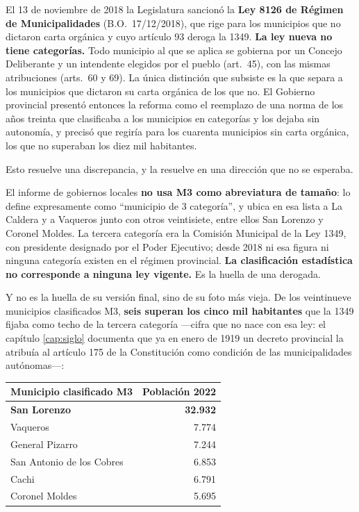 El 13 de noviembre de 2018 la Legislatura sancionó la \textbf{Ley 8126 de Régimen de Municipalidades} (B.O.\ 17/12/2018), que rige para los municipios que no dictaron carta orgánica y cuyo artículo 93 deroga la 1349. \textbf{La ley nueva no tiene categorías.} Todo municipio al que se aplica se gobierna por un Concejo Deliberante y un intendente elegidos por el pueblo (art.\ 45), con las mismas atribuciones (arts.\ 60 y 69). La única distinción que subsiste es la que separa a los municipios que dictaron su carta orgánica de los que no. El Gobierno provincial presentó entonces la reforma como el reemplazo de una norma de los años treinta que clasificaba a los municipios en categorías y los dejaba sin autonomía, y precisó que regiría para los cuarenta municipios sin carta orgánica, los que no superaban los diez mil habitantes.

\begin{cautela}
Esto resuelve una discrepancia, y la resuelve en una dirección que no se esperaba.

El informe de gobiernos locales \textbf{no usa M3 como abreviatura de tamaño}: lo define expresamente como ``municipio de 3\textordmasculine{} categoría'', y ubica en esa lista a La Caldera y a Vaqueros junto con otros veintisiete, entre ellos San Lorenzo y Coronel Moldes. La tercera categoría era la Comisión Municipal de la Ley 1349, con presidente designado por el Poder Ejecutivo; desde 2018 ni esa figura ni ninguna categoría existen en el régimen provincial. \textbf{La clasificación estadística no corresponde a ninguna ley vigente.} Es la huella de una derogada.

Y no es la huella de su versión final, sino de su foto más vieja. De los veintinueve municipios clasificados M3, \textbf{seis superan los cinco mil habitantes} que la 1349 fijaba como techo de la tercera categoría ---cifra que no nace con esa ley: el capítulo \ref{cap:siglo} documenta que ya en enero de 1919 un decreto provincial la atribuía al artículo 175 de la Constitución como condición de las municipalidades autónomas---:
\end{cautela}

{\small
\begin{longtable}{@{}lr@{}}
\toprule
\textbf{Municipio clasificado M3} & \textbf{Población 2022} \\
\midrule
\endhead
\textbf{San Lorenzo} & \textbf{32.932} \\
Vaqueros & 7.774 \\
General Pizarro & 7.244 \\
San Antonio de los Cobres & 6.853 \\
Cachi & 6.791 \\
Coronel Moldes & 5.695 \\
\bottomrule
\end{longtable}}

